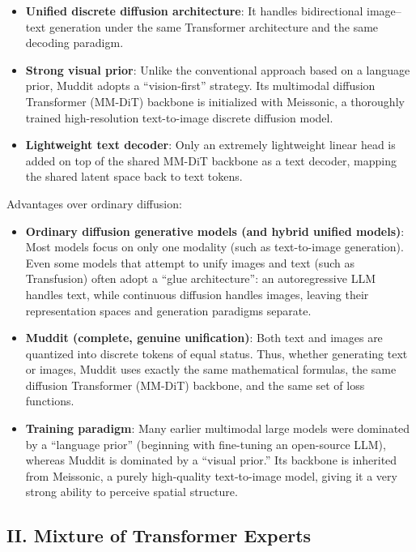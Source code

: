 \begin{itemize}
\tightlist
\item
  \textbf{Unified discrete diffusion architecture}: It handles bidirectional image--text generation under the same Transformer architecture and the same decoding paradigm.
\item
  \textbf{Strong visual prior}: Unlike the conventional approach based on a language prior, Muddit adopts a ``vision-first'' strategy. Its multimodal diffusion Transformer (MM-DiT) backbone is initialized with Meissonic, a thoroughly trained high-resolution text-to-image discrete diffusion model.
\item
  \textbf{Lightweight text decoder}: Only an extremely lightweight linear head is added on top of the shared MM-DiT backbone as a text decoder, mapping the shared latent space back to text tokens.
\end{itemize}

Advantages over ordinary diffusion:

\begin{itemize}
\tightlist
\item
  \textbf{Ordinary diffusion generative models (and hybrid unified models)}: Most models focus on only one modality (such as text-to-image generation). Even some models that attempt to unify images and text (such as Transfusion) often adopt a ``glue architecture'': an autoregressive LLM handles text, while continuous diffusion handles images, leaving their representation spaces and generation paradigms separate.
\item
  \textbf{Muddit (complete, genuine unification)}: Both text and images are quantized into discrete tokens of equal status. Thus, whether generating text or images, Muddit uses exactly the same mathematical formulas, the same diffusion Transformer (MM-DiT) backbone, and the same set of loss functions.
\item
  \textbf{Training paradigm}: Many earlier multimodal large models were dominated by a ``language prior'' (beginning with fine-tuning an open-source LLM), whereas Muddit is dominated by a ``visual prior.'' Its backbone is inherited from Meissonic, a purely high-quality text-to-image model, giving it a very strong ability to perceive spatial structure.
\end{itemize}

\hypertarget{ii.-mixture-of-transformer-experts}{%
\subsection{II. Mixture of Transformer Experts}\label{ii.-mixture-of-transformer-experts}}

